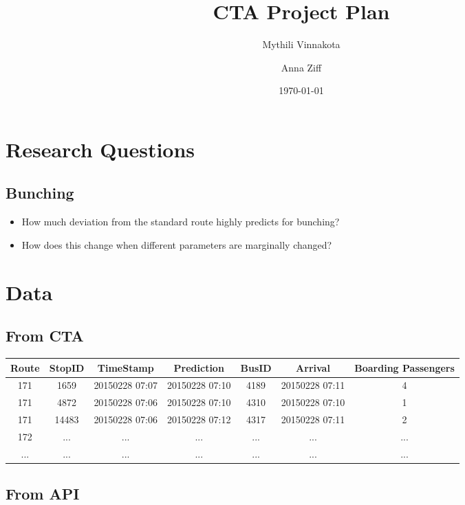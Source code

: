 \documentclass{article}
\begin{document}
\title{CTA Project Plan}
\author{Mythili Vinnakota \and Anna Ziff}
\date{\today}
\maketitle

\section{Research Questions}

\subsection{Bunching}
\begin{itemize}
	\item How much deviation from the standard route highly predicts for bunching?
	\item How does this change when different parameters are marginally changed?
\end{itemize}


\section{Data}

\subsection{From CTA}

\begin{table}[h]
\begin{center}
\begin{tabular}{ c | c | c | c | c | c | c }
Route & StopID & TimeStamp & Prediction & BusID & Arrival & Boarding Passengers \\
\hline
171 & 1659 & 20150228 07:07 & 20150228 07:10 & 4189 & 20150228 07:11 & 4 \\
171 & 4872 & 20150228 07:06 & 20150228 07:10 & 4310 & 20150228 07:10 & 1 \\
171 &14483 & 20150228 07:06	& 20150228 07:12 & 4317 & 20150228 07:11 & 2 \\
172 & ... & ... & ... & ... & ... & ... \\
...  & ... & ... & ... & ... & ... & ... 
\end{tabular}
\end{center}
\end{table}

\subsection{From API}
\end{document}
